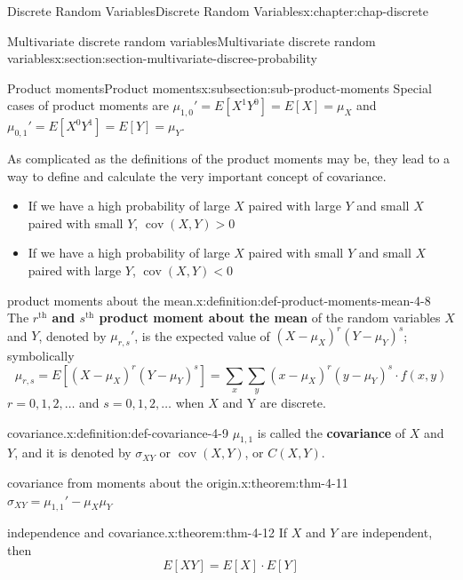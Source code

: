\documentclass[oneside,10pt,]{book}
\newcommand{\terminology}[1]{\textbf{#1}}
\newcommand{\lt}{<}
\newcommand{\gt}{>}
\begin{document}
\begin{chapterptx}{Discrete Random Variables}{}{Discrete Random Variables}{}{}{x:chapter:chap-discrete}
\begin{sectionptx}{Multivariate discrete random variables}{}{Multivariate discrete random variables}{}{}{x:section:section-multivariate-discree-probability}
\begin{subsectionptx}{Product moments}{}{Product moments}{}{}{x:subsection:sub-product-moments}
Special cases of product moments are \(\displaystyle \mu_{1,0}' =
E[X^1Y^0] = E[X] = \mu_X\) and \(\displaystyle \mu_{0,1}' = E[X^0Y^1]
= E[Y] = \mu_Y\).%
\par
As complicated as the definitions of the product moments may be, they lead to a way to define and calculate the very important concept of covariance.%
\begin{itemize}[label=\textbullet]
\item{}If we have a high probability of large \(X\) paired with large \(Y\) and small \(\displaystyle
X\) paired with small \(Y\), \(\displaystyle
\operatorname{cov}(X,Y) \gt 0\)%
\item{}If we have a high probability of large \(X\) paired with small \(Y\) and small \(\displaystyle
X\) paired with large \(Y\), \(\displaystyle
\operatorname{cov}(X,Y) \lt 0\)%
\end{itemize}
%
\begin{definition}{product moments about the mean.}{x:definition:def-product-moments-mean-4-8}%
The \terminology{\(\displaystyle r^\text{th}\) and \(\displaystyle
s^\text{th}\) product moment about the mean} of the random variables \(X\) and \(Y\), denoted by \(\displaystyle \mu_{r,s}'\), is the expected value of \(\displaystyle (X-\mu_X)^r(Y-\mu_Y)^s\); symbolically%
\begin{equation*}
\mu_{r,s}=E[(X-\mu_X)^r(Y-\mu_Y)^s] = \sum_x\sum_y (x-\mu_X)^r
(y-\mu_Y)^s\cdot f(x, y)
\end{equation*}
\(\displaystyle r = 0,1,2, \dots\) and \(\displaystyle s = 0,1,2, \dots\) when \(X\) and Y are discrete.%
\end{definition}
\begin{definition}{covariance.}{x:definition:def-covariance-4-9}%
\(\displaystyle \mu_{1,1}\) is called the \terminology{covariance} of \(X\) and \(Y\), and it is denoted by \(\displaystyle \sigma_{XY}\) or \(\displaystyle
\operatorname{cov}(X, Y)\), or \(\displaystyle C(X, Y)\).%
\end{definition}
\begin{theorem}{covariance from moments about the origin.}{}{x:theorem:thm-4-11}%
\(\displaystyle \sigma_{XY} = \mu_{1,1}' - \mu_X \mu_Y\)%
\end{theorem}
\begin{theorem}{independence and covariance.}{}{x:theorem:thm-4-12}%
If \(X\) and \(Y\) are independent, then%
\begin{equation*}
\displaystyle E[XY] = E[X]\cdot E[Y]
\end{equation*}

\end{theorem}
\end{subsectionptx}
\end{sectionptx}
\end{chapterptx}
\end{document}
